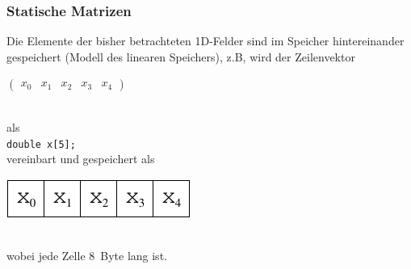 \subsubsection{Statische Matrizen}
\label{p:5.1.4.a}
%
%
Die Elemente der bisher betrachteten 1D-Felder sind im
Speicher hintereinander gespeichert (Modell des linearen Speichers), z.B,
wird der Zeilenvektor
\\[0.5ex]
\centerline{$\begin{pmatrix} x_0 & x_1 & x_2 & x_3 & x_4 \end{pmatrix}$}
\\
als
\\
%
\mbox{} \hfill\verb|double x[5];| \hfill\mbox{}
%
\\
vereinbart und gespeichert als
\\
\centerline{\includegraphics[scale=0.9]{kap512a.pdf}}
\\
wobei jede Zelle 8~Byte lang ist.

